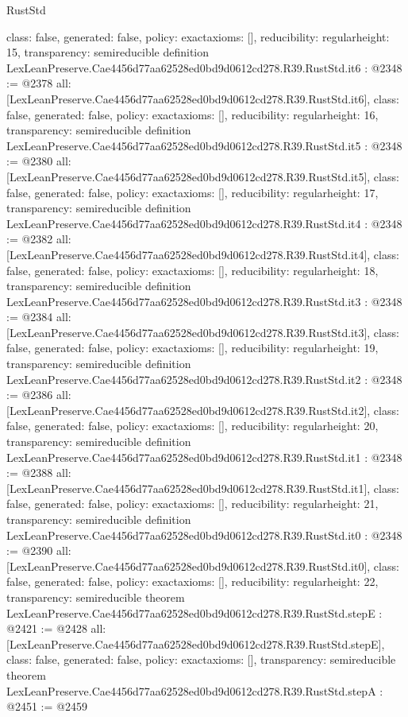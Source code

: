 \begin{lexlean}{RustStd}
\begin{coremodule}
{  class: false,
  generated: false,
  policy: exact{axioms: []},
  reducibility: regular{height: 15},
  transparency: semireducible
}
definition LexLeanPreserve.Cae4456d77aa62528ed0bd9d0612cd278.R39.RustStd.it6 : @2348 := @2378 {
  all: [LexLeanPreserve.Cae4456d77aa62528ed0bd9d0612cd278.R39.RustStd.it6],
  class: false,
  generated: false,
  policy: exact{axioms: []},
  reducibility: regular{height: 16},
  transparency: semireducible
}
definition LexLeanPreserve.Cae4456d77aa62528ed0bd9d0612cd278.R39.RustStd.it5 : @2348 := @2380 {
  all: [LexLeanPreserve.Cae4456d77aa62528ed0bd9d0612cd278.R39.RustStd.it5],
  class: false,
  generated: false,
  policy: exact{axioms: []},
  reducibility: regular{height: 17},
  transparency: semireducible
}
definition LexLeanPreserve.Cae4456d77aa62528ed0bd9d0612cd278.R39.RustStd.it4 : @2348 := @2382 {
  all: [LexLeanPreserve.Cae4456d77aa62528ed0bd9d0612cd278.R39.RustStd.it4],
  class: false,
  generated: false,
  policy: exact{axioms: []},
  reducibility: regular{height: 18},
  transparency: semireducible
}
definition LexLeanPreserve.Cae4456d77aa62528ed0bd9d0612cd278.R39.RustStd.it3 : @2348 := @2384 {
  all: [LexLeanPreserve.Cae4456d77aa62528ed0bd9d0612cd278.R39.RustStd.it3],
  class: false,
  generated: false,
  policy: exact{axioms: []},
  reducibility: regular{height: 19},
  transparency: semireducible
}
definition LexLeanPreserve.Cae4456d77aa62528ed0bd9d0612cd278.R39.RustStd.it2 : @2348 := @2386 {
  all: [LexLeanPreserve.Cae4456d77aa62528ed0bd9d0612cd278.R39.RustStd.it2],
  class: false,
  generated: false,
  policy: exact{axioms: []},
  reducibility: regular{height: 20},
  transparency: semireducible
}
definition LexLeanPreserve.Cae4456d77aa62528ed0bd9d0612cd278.R39.RustStd.it1 : @2348 := @2388 {
  all: [LexLeanPreserve.Cae4456d77aa62528ed0bd9d0612cd278.R39.RustStd.it1],
  class: false,
  generated: false,
  policy: exact{axioms: []},
  reducibility: regular{height: 21},
  transparency: semireducible
}
definition LexLeanPreserve.Cae4456d77aa62528ed0bd9d0612cd278.R39.RustStd.it0 : @2348 := @2390 {
  all: [LexLeanPreserve.Cae4456d77aa62528ed0bd9d0612cd278.R39.RustStd.it0],
  class: false,
  generated: false,
  policy: exact{axioms: []},
  reducibility: regular{height: 22},
  transparency: semireducible
}
theorem LexLeanPreserve.Cae4456d77aa62528ed0bd9d0612cd278.R39.RustStd.stepE : @2421 := @2428 {
  all: [LexLeanPreserve.Cae4456d77aa62528ed0bd9d0612cd278.R39.RustStd.stepE],
  class: false,
  generated: false,
  policy: exact{axioms: []},
  transparency: semireducible
}
theorem LexLeanPreserve.Cae4456d77aa62528ed0bd9d0612cd278.R39.RustStd.stepA : @2451 := @2459 {
}
\end{coremodule}
\end{lexlean}
